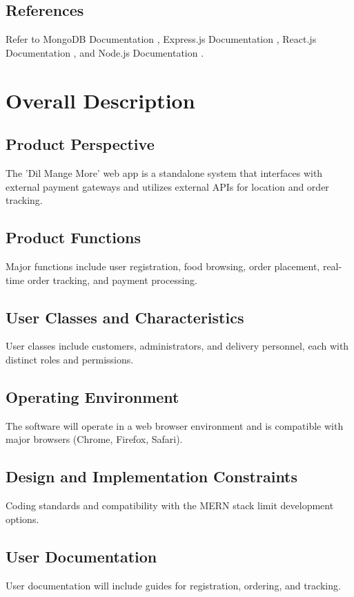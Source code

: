 \documentclass{article}
\begin{document}
\subsection{References}
Refer to MongoDB Documentation \cite{mongodb-doc}, Express.js Documentation \cite{express-doc}, React.js Documentation \cite{react-doc}, and Node.js Documentation \cite{node-doc}.

\newpage
\section{Overall Description}
\subsection{Product Perspective}
The 'Dil Mange More' web app is a standalone system that interfaces with external payment gateways and utilizes external APIs for location and order tracking.

\subsection{Product Functions}
Major functions include user registration, food browsing, order placement, real-time order tracking, and payment processing.

\subsection{User Classes and Characteristics}
User classes include customers, administrators, and delivery personnel, each with distinct roles and permissions.

\subsection{Operating Environment}
The software will operate in a web browser environment and is compatible with major browsers (Chrome, Firefox, Safari).

\subsection{Design and Implementation Constraints}
Coding standards and compatibility with the MERN stack limit development options.

\subsection{User Documentation}
User documentation will include guides for registration, ordering, and tracking.
\end{document}
